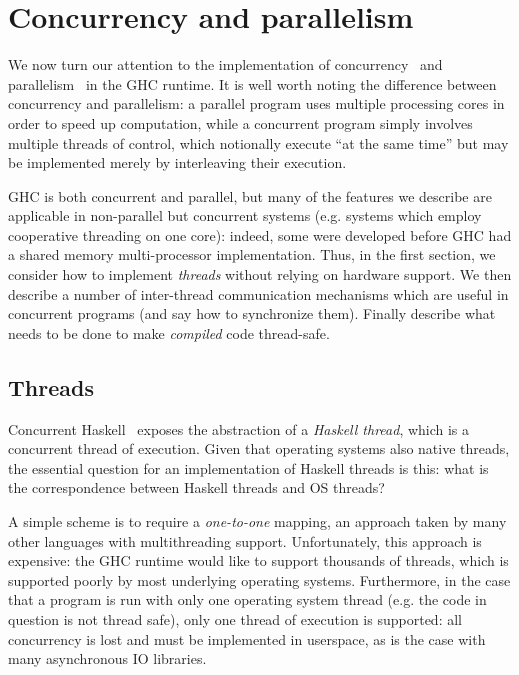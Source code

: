 \section{Concurrency and parallelism}

We now turn our attention to the implementation of
concurrency~\cite{PeytonJones:1996:CH:237721.237794} and
parallelism~\cite{Harris:2005:HSM:1088348.1088354} in the GHC runtime.
It is well worth noting the difference between concurrency and
parallelism: a parallel program uses multiple processing cores in order
to speed up computation, while a concurrent program simply involves
multiple threads of control, which notionally execute ``at the same
time'' but may be implemented merely by interleaving their execution.

GHC is both concurrent and parallel, but many of the features we
describe are applicable in non-parallel but concurrent systems (e.g.
systems which employ cooperative threading on one core): indeed, some
were developed before GHC had a shared memory multi-processor
implementation.  Thus, in the first section, we consider how to
implement \emph{threads} without relying on hardware support.  We then
describe a number of inter-thread communication mechanisms which are
useful in concurrent programs (and say how to synchronize them). Finally
describe what needs to be done to make \emph{compiled} code thread-safe.

\subsection{Threads}

Concurrent Haskell~\cite{PeytonJones:1996:CH:237721.237794} exposes the
abstraction of a \emph{Haskell thread}, which is a concurrent thread of
execution.  Given that operating systems also native threads, the
essential question for an implementation of Haskell threads is this:
what is the correspondence between Haskell threads and OS threads?

A simple scheme is to require a \emph{one-to-one} mapping, an approach
taken by many other languages with multithreading support.
Unfortunately, this approach is expensive: the GHC runtime would like to
support thousands of threads, which is supported poorly by most
underlying operating systems.  Furthermore, in the case that a program
is run with only one operating system thread (e.g. the code in question
is not thread safe), only one thread of execution is supported: all
concurrency is lost and must be implemented in userspace, as is the
case with many asynchronous IO libraries.

